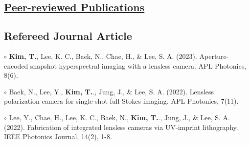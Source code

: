 \documentclass[a4paper,9pt]{extarticle}
\begin{document}
\begin{spacing}{1.05}


\section*{\href{https://scholar.google.com/citations?user=U3-aG5oAAAAJ&hl=ko}{Peer-reviewed Publications}}
 

\subsection*{Refereed Journal Article} 
$\circ$ \textbf{Kim, T.}, Lee, K. C., Baek, N., Chae, H., \& Lee, S. A. (2023). Aperture-encoded snapshot hyperspectral imaging with a lensless camera. APL Photonics, 8(6). 

\noindent $\circ$ Baek, N., Lee, Y., \textbf{Kim, T.}., Jung, J., \& Lee, S. A. (2022). Lensless polarization camera for single-shot full-Stokes imaging. APL Photonics, 7(11). 

\noindent $\circ$ Lee, Y., Chae, H., Lee, K. C., Baek, N., \textbf{Kim, T.}., Jung, J., \& Lee, S. A. (2022). Fabrication of integrated lensless cameras via UV-imprint lithography. IEEE Photonics Journal, 14(2), 1-8.




\end{spacing}
\end{document}
